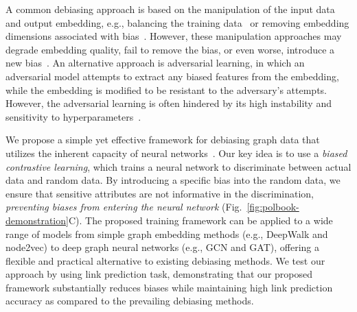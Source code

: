 \documentclass{article}
\theoremstyle{plain}
\theoremstyle{definition}
\theoremstyle{remark}
\begin{document}
A common debiasing approach is based on the manipulation of the input data and output embedding, e.g., balancing the training data~\cite{khajehnejadCrossWalkFairnessenhancedNode2022,rahmanFairwalkFairGraph2019,solaimanProcessAdaptingLanguage2021} or removing embedding dimensions associated with bias~\cite{DBLP:journals/corr/BolukbasiCZSK16a,ravfogel-etal-2020-null}.
However, these manipulation approaches may degrade embedding quality, fail to remove the bias, or even worse, introduce a new bias~\cite{ravfogel-etal-2020-null,boseCompositionalFairnessConstraints2019,Edwards2015CensoringRW}.
An alternative approach is adversarial learning, in which  an adversarial model attempts to extract any biased features from the embedding, while the embedding is modified to be resistant to the adversary's attempts.
However, the adversarial learning is often hindered by its high instability and sensitivity to hyperparameters~\cite{xing2021algorithmic}.

We propose a simple yet effective framework for debiasing graph data that utilizes the inherent capacity of neural networks~\cite{kojakuResidual2VecDebiasingGraph2021}. Our key idea is to use a \textit{biased contrastive learning}, which trains a neural network to discriminate between actual data and random data. By introducing a specific bias into the random data, we ensure that sensitive attributes are not informative in the discrimination, \emph{preventing biases from entering the neural network} (Fig.~\ref{fig:polbook-demonstration}C). 
The proposed training framework can be applied to a wide range of models from simple graph embedding methods (e.g., DeepWalk and node2vec) to deep graph neural networks (e.g., GCN and GAT), offering a flexible and practical alternative to existing debiasing methods.
We test our approach by using link prediction task, demonstrating that our proposed framework substantially reduces biases while maintaining high link prediction accuracy as compared to the prevailing debiasing methods. 

\end{document}
